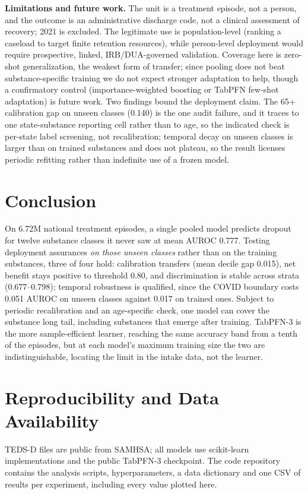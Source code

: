 \documentclass[conference]{IEEEtran}
\begin{document}
\textbf{Limitations and future work.} The unit is a treatment episode, not a person, and the
outcome is an administrative discharge code, not a clinical assessment of recovery; 2021 is
excluded. The legitimate use is population-level (ranking a caseload to target finite retention resources),
while person-level deployment would require prospective, linked, IRB/DUA-governed validation.
Coverage here is zero-shot generalization, the weakest form of transfer; since pooling does not
beat substance-specific training we do not expect stronger adaptation to help, though a
confirmatory control (importance-weighted boosting \cite{importance_weight} or TabPFN few-shot
adaptation) is future work. Two findings bound the deployment claim. The 65+
calibration gap on unseen classes (0.140) is the one audit failure, and it traces to one
state-substance reporting cell rather than to age, so the indicated check is per-state label
screening, not recalibration;
temporal decay on unseen classes is larger than on trained substances and does not plateau, so the
result licenses periodic refitting rather than indefinite use of a frozen model.

\section{Conclusion}
On 6.72M national treatment episodes, a single pooled model predicts dropout for twelve
substance classes it never saw at mean AUROC 0.777. Testing deployment assurances \emph{on those
unseen classes} rather than on the training substances, three of four hold: calibration transfers
(mean decile gap 0.015), net benefit stays positive to threshold 0.80, and discrimination is
stable across strata (0.677--0.798); temporal robustness is qualified, since the COVID boundary
costs 0.051 AUROC on unseen classes against 0.017 on trained ones. Subject to periodic
recalibration and an age-specific check, one model can cover the substance long tail, including
substances that emerge after training. TabPFN-3 is the more sample-efficient learner, reaching
the same accuracy band from a tenth of the episodes, but at each model's maximum training size the
two are indistinguishable, locating the limit in the intake data, not the learner.

\section*{Reproducibility and Data Availability}
TEDS-D files are public from SAMHSA; all models use scikit-learn implementations and the public
TabPFN-3 checkpoint. The code repository contains the analysis scripts, hyperparameters, a data
dictionary and one CSV of results per experiment, including every value plotted here.
\end{document}
